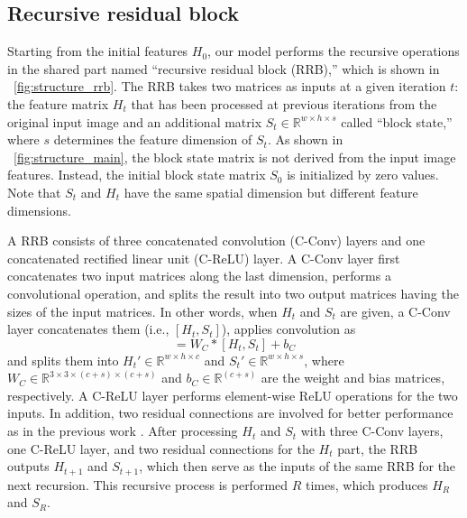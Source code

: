 \documentclass[runningheads]{llncs}
\begin{document}
\subsection{Recursive residual block}
\label{sec:rrb}

Starting from the initial features ${H}_{0}$, our model performs the recursive operations in the shared part named ``recursive residual block (RRB),'' which is shown in \figurename~\ref{fig:structure_rrb}.
The RRB takes two matrices as inputs at a given iteration $t$: the feature matrix ${H}_{t}$ that has been processed at previous iterations from the original input image and an additional matrix ${S}_{t}\in\mathbb{R}^{{w}\times{h}\times{s}}$ called ``block state,'' where $s$ determines the feature dimension of ${S}_{t}$.
As shown in \figurename~\ref{fig:structure_main}, the block state matrix is not derived from the input image features.
Instead, the initial block state matrix ${S}_{0}$ is initialized by zero values.
Note that ${S}_{t}$ and ${H}_{t}$ have the same spatial dimension but different feature dimensions.

A RRB consists of three concatenated convolution (C-Conv) layers and one concatenated rectified linear unit (C-ReLU) layer.
A C-Conv layer first concatenates two input matrices along the last dimension, performs a convolutional operation, and splits the result into two output matrices having the sizes of the input matrices.
In other words, when ${H}_{t}$ and ${S}_{t}$ are given, a C-Conv layer concatenates them (i.e., $[{H}_{t}, {S}_{t}]$), applies convolution as
\begin{equation}
[{H}_{t}', {S}_{t}'] = {W}_{C}\ast [{H}_{t}, {S}_{t}] + {b}_{C}
\end{equation}
and splits them into ${H}_{t}'\in\mathbb{R}^{{w}\times{h}\times{c}}$ and ${S}_{t}'\in\mathbb{R}^{{w}\times{h}\times{s}}$, where ${W}_{C}\in\mathbb{R}^{3\times3\times{(c+s)}\times{(c+s)}}$ and ${b}_{C}\in\mathbb{R}^{(c+s)}$ are the weight and bias matrices, respectively.
A C-ReLU layer performs element-wise ReLU operations for the two inputs.
In addition, two residual connections are involved for better performance as in the previous work \cite{kim2016accurate,kim2018deep}.
After processing ${H}_{t}$ and ${S}_{t}$ with three C-Conv layers, one C-ReLU layer, and two residual connections for the ${H}_{t}$ part, the RRB outputs ${H}_{t+1}$ and ${S}_{t+1}$, which then serve as the inputs of the same RRB for the next recursion.
This recursive process is performed $R$ times, which produces ${H}_{R}$ and ${S}_{R}$.
\end{document}
